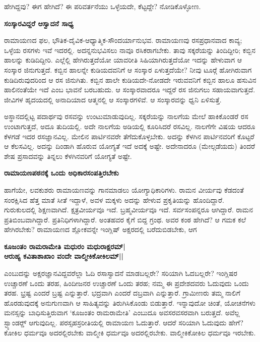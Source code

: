 ಹೇಗಿದ್ದವು? ಈಗ ಹೇಗಿದೆ? ಈ ಪರಿವರ್ತನೆಯು ಒಳ್ಳೆಯದೇ, ಕೆಟ್ಟದ್ದೇ? ನೋಡಿಕೊಳ್ಳೋಣ. 


{\bf ಸಂಸ್ಕಾರವಿದ್ದರೆ ಆಸ್ವಾದನೆ ಸಾಧ್ಯ} 


ರಾಮಾಯಣದ ಫಲ, ಭೌತಿಕ-ದೈವಿಕ-ಆಧ್ಯಾತ್ಮಿಕ-ಸೌಂದರ್ಯಾನುಭವ. ರಾಮಾಯಣವು ರಸಪ್ರಧಾನವಾದ ಕಾವ್ಯ; ಒಳ್ಳೆಯ ರಸಗಳು ಇವೆ ಇದರಲ್ಲಿ. ಅದನ್ನನುಭವಿಸಲು ನಾವೂ ರಸಿಕರಾಗಬೇಕು. ತಾವು ಸಕ್ಕರೆಯನ್ನು ತಿಂದಿದ್ದೀರಿ; ಕಬ್ಬಿನ ಹಾಲನ್ನು ಕುಡಿದಿದ್ದೀರಿ. ಎಲ್ಲೆಲ್ಲಿ ಹೇಗಿರುತ್ತದೆಯೋ ಯಾವರೀತಿ ಸಿಹಿಯಾಗಿರುತ್ತದೆಯೋ ಇದನ್ನು ಹೇಳುವಾಗ ಆ ಸಂಸ್ಕಾರ ಜಿನುಗುತ್ತದೆ. ಕಬ್ಬಿನ ಹಾಲನ್ನೇ ಕುಡಿಯದವನಿಗೆ ಆ ಸಂಸ್ಕಾರ ಏಳುತ್ತದೆಯೇ? ನೀವು ಟೂರ್‍ಗೆ ಹೋಗಿರುವಾಗ ಕುಡಿದಿರುವುದರಿಂದ ಆ ರಸ ಜಿನುಗಿತು. ಕಬ್ಬಿನ ಹಾಲೇ ಕುಡಿಯದೇ-ನೋಡದೇ ಇರುವವನಿಗೆ ಕಬ್ಬಿನ ಹಾಲೂ ಹಸುವಿನ ಹಾಲಿನಂತೆಯೇ ಇದೆ ಎಂಬ ಭಾವನೆ ಬರಬಹುದು. ಆ ಸಂಸ್ಕಾರವಾದರೂ ಇದ್ದರೆ ರಸ ಜಿನುಗಲು ಸಹಾಯವಾಗುತ್ತದೆ. ಜೀವಿಗಳ ಹೃದಯದಲ್ಲಿ ಅನಾದಿಯಾದ ಆತ್ಮನಲ್ಲಿ ಆ ಸಂಸ್ಕಾರಗಳಿವೆ. ಆ ಸಂಸ್ಕಾರವನ್ನು ಧ್ವನಿ ಏಳಿಸುತ್ತೆ. 

ಅಸ್ಥಾನದಲ್ಲಿಟ್ಟ ಪದಾರ್ಥವು ರಸವನ್ನು ಉಂಟುಮಾಡುವುದಿಲ್ಲ. ಸಕ್ಕರೆಯನ್ನು ನಾಲಗೆಯ ಮೇಲೆ ಹಾಕಿಕೊಂಡರೆ ರಸ ಉಂಟಾಗುತ್ತದೆ, ಅದೂ ತುದಿಯಲ್ಲಿ. ಅದೇ ನಾಲಗೆಯ ಅಡಿಯಲ್ಲಿ ಕೂರಿಸಿದರೆ ರಸವಿಲ್ಲ. ನಾಲಗೆಗೇ ವಿಷಯ ಆದರೂ ಕೆಳಗಡೆ ಇದರ ರಸಜ್ಞಾನವಿಲ್ಲ. ಮೇಲಿನ ಪಾರ್ಟಿನವರೇ ತೆಗೆದುಕೊಳ್ಳಬೇಕು. ಅದನ್ನು ಕೆಳಗಿನ ಪಾರ್ಟಿನವರಿಗೆ ಕೊಟ್ಟರೆ ಆ ಕೆಲಸವಿಲ್ಲ. ಅದನ್ನು ದಿಂಡಾಗಿ ಹೊರುವ ಯೋಗ್ಯತೆ ಇದೆ ಅದಕ್ಕೆ ಅಷ್ಟೇ. ಅದೇನಾದರೂ (ಮೇಲ್ಗಡೆಯದು) ತಿಂದರೆ ಶೇಷ ಪ್ರಸಾದವನ್ನು ತಿನ್ನಲು ಕೆಳಗಿನವರಿಗೆ ಯೋಗ್ಯತೆ ಅಷ್ಟೇ. 


{\bf ರಾಮಾಯಣಪಠನಕ್ಕೆ ಒಂದು ಅಧಿಕಾರಸಂಪತ್ತಿರಬೇಕು} 


ಹಾಗೆಯೇ, ಲವಕುಶರು ರಾಮಾಯಣವನ್ನು ಗಾನಮಾಡಲು ಯೋಗ್ಯಾಧಿಕಾರಿಗಳು. ರಾಮನ ವೀರ್ಯವು ಕೆಡದಂತೆ ಸಂರಕ್ಷಿಸಿದ ಹೆತ್ತ ಮಾತೆ ಸೀತೆ ಇದ್ದಾಳೆ, ಅವಳ ಮಕ್ಕಳು ಅದನ್ನು ಹೇಳುವ ಪ್ರಕೃತಿಯನ್ನು ಹೊಂದಿದ್ದಾರೆ. ಗುರುಕುಲದಲ್ಲಿ ಶಿಕ್ಷಣವಾಗಿದೆ. ಕ್ಷತ್ರವೀರ್ಯವೂ ಇದೆ. ಬ್ರಹ್ಮವೀರ್ಯವೂ ಇದೆ. ಸರ್ವಸಂಪನ್ನರೂ ಆಗಿದ್ದಾರೆ. ರಾಮನ ಪ್ರತಿಬಿಂಬವಾಗಿದ್ದಾರೆ. ಪ್ರತಿನಿಧಿಗಳಾಗಿದ್ದಾರೆ. ಅಂತಹವರ ಕೈಗೆ ಬಿದ್ದ ಗ್ರಂಥ. ಅವರ ಕಂಠ ಹೇಗಿದೆ? ಆ ಗಮಕ ಕಲೆ ಹೇಗಿರಬೇಕು? ರಾಮಾಯಣದ ಶ್ಲೋಕವನ್ನೇ ಇಂಗ್ಲಿಷ್‍ ಅಕ್ಷರದಲ್ಲಿ ಬರೆದುಬಿಡಬೇಕು, ಆಗ 


\begin{center} 

{\bf ಕೂಜಂತಂ ರಾಮರಾಮೇತಿ ಮಧುರಂ ಮಧುರಾಕ್ಷರಮ್‍|\\ 

ಆರುಹ್ಯ ಕವಿತಾಶಾಖಾಂ ವಂದೇ ವಾಲ್ಮೀಕಿಕೋಕಿಲಮ್‍||} 

\end{center} 


ಎಂಬುದನ್ನು ಅಕ್ಷರಜ್ಞಾನವಿದ್ದವರೆಲ್ಲಾ ಓದಿ ರಸಾಸ್ವಾದನೆ ಮಾಡಬಲ್ಲರೇ? ಸರಿಯಾಗಿ ಓದಬಲ್ಲರೇ? ಇಂಗ್ಲಿಷರ ಉಚ್ಚಾರಣೆ ಒಂದು ತರಹ, ಹಿಂದೀಜನರ ಉಚ್ಚಾರಣೆ ಒಂದು ತರಹ; ನಮ್ಮ ಈ ಪ್ರದೇಶದವರು ಓದುವುದು ಒಂದು ತರಹ. ಭ್ರಷ್ಟ ಎಂದರೆ ಬ್ರಷ್ಟ ಎನ್ನುತ್ತಾರೆ. ಭದ್ರವಾಗಿ ಎಂದರೆ ದಬ್ರವಾಗಿ ಎನ್ನುತ್ತಾರೆ. ಗ್ರಾಮೀಣರು ತಮ್ಮ ನಾಲಿಗೆ ಹೊರಡುವುದಕ್ಕೆ ಅನುಗುಣವಾಗಿ ಆ ಸಾಹಿತ್ಯವನ್ನು ತಿರುಗಿಸಿಕೊಂಡು ಬಿಡುತ್ತಾರೆ. ಇನ್ನಾವುದೋ ಚಿಂತೆ, ಯೋಚನೆಗಳು ಮನಸ್ಸನ್ನು ಬಾಧಿಸುತ್ತಿರುವಾಗ `ಕೂಜಂತಂ ರಾಮರಾಮೇತಿ' ಎಂಬುದೂ ಅವಸರವಸರವಾಗಿ ಬರುತ್ತದೆ. ಅವೆಲ್ಲ ಸ್ಟ್ಯಾಂಡರ್ಡ್‍ ಆಗುವುದಿಲ್ಲ. ಪರಸ್ಸಹಸ್ರರೀತಿಯಲ್ಲಿ ರಾಮಾಯಣ ಓದುತ್ತಾರೆ. ಆದರೆ ಸರಿಯಾಗಿ ಓದುವುದು ಹೇಗೆ? ಕೋಕಿಲ ಧರ್ಮವೂ ಅದರಲ್ಲಿರಬೇಕು ವಾಲ್ಮೀಕಿ ಧರ್ಮವೂ ಅದರಲ್ಲಿರಬೇಕು. ವಾಲ್ಮೀಕಿಕೋಕಿಲ ಧರ್ಮವೂ ಇರಬೇಕು. 


